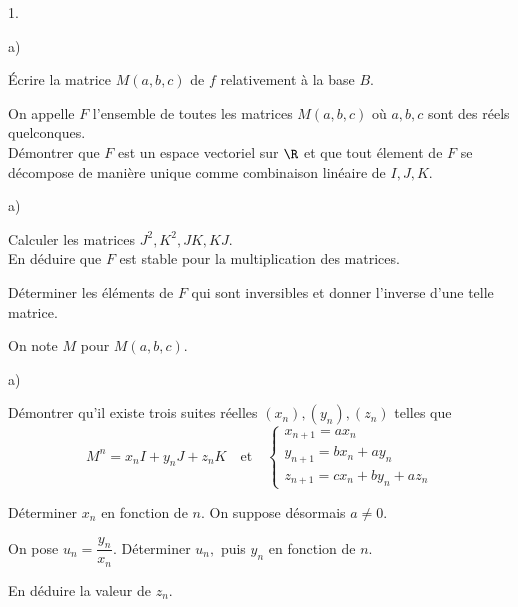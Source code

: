 \documentclass[11pt]{article}%
\begin{document}
\begin{noliste}{1.}
 \setlength{\itemsep}{4mm}
\item 

\begin{noliste}{a)}
 \setlength{\itemsep}{2mm}
\item Écrire la matrice $M(a,b,c)$ de $f$ relativement à la base $B.$

\item On appelle $F$ l'ensemble de toutes les matrices $M(a,b,c)$ où
$a,b,c$
sont des réels quelconques.\\
Démontrer que $F$ est un espace vectoriel sur $\R$ et que tout élement
de $F$ se décompose de manière unique comme combinaison linéaire de
$I,J,K.$
\end{noliste}

\item 

\begin{noliste}{a)}
 \setlength{\itemsep}{2mm}
\item Calculer les matrices $J^{2},K^{2},JK,KJ.$\\
En déduire que $F$ est stable pour la multiplication des matrices.

\item Déterminer les éléments de $F$ qui sont inversibles et donner
l'inverse d'une telle matrice.
\end{noliste}

\item On note $M$ pour $M(a,b,c).$

\begin{noliste}{a)}
 \setlength{\itemsep}{2mm}
\item Démontrer qu'il existe trois suites réelles
$(x_{n}),(y_{n}),(z_{n})$
telles que 
\[
M^{n} = x_{n}I + y_{n}J + z_{n}K\quad \text{et}\quad \left\{ 
\begin{array}{c}
x_{n + 1} = ax_{n} \\
y_{n + 1} = bx_{n} + ay_{n} \\
z_{n + 1} = cx_{n} + by_{n} + az_{n}
\end{array}
\right. 
\]

\item Déterminer $x_{n}$ en fonction de $n.$ On suppose désormais
$a\neq 0.$

\item On pose $u_{n} = \dfrac{y_{n}}{x_{n}}.$ Déterminer $u_{n},$ puis
$y_{n}$
en fonction de $n.$

\item En déduire la valeur de $z_{n}.$
\end{noliste}
\end{noliste}
\end{document}

